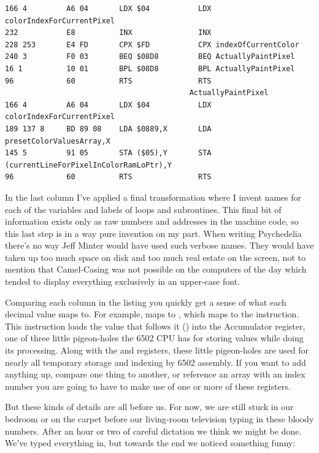 \begin{lstlisting}[basicstyle=\tiny]
166 4         A6 04       LDX $04           LDX colorIndexForCurrentPixel                    
232           E8          INX               INX                                              
228 253       E4 FD       CPX $FD           CPX indexOfCurrentColor                          
240 3         F0 03       BEQ $08D8         BEQ ActuallyPaintPixel                           
16 1          10 01       BPL $08D8         BPL ActuallyPaintPixel                           
96            60          RTS               RTS                                              
                                          ActuallyPaintPixel                               
166 4         A6 04       LDX $04           LDX colorIndexForCurrentPixel                    
189 137 8     BD 89 08    LDA $0889,X       LDA presetColorValuesArray,X                     
145 5         91 05       STA ($05),Y       STA (currentLineForPixelInColorRamLoPtr),Y       
96            60          RTS               RTS                               
\end{lstlisting}

In the last column I've applied a final transformation where I invent names for each of the variables and
labels of loops and subroutines. This final bit of information exists only as raw numbers and addresses
in the machine code, so this last step is in a way pure invention on my part. When writing Psychedelia
there's no way Jeff Minter would have used such verbose names. They would have taken up too much space on
disk and too much real estate on the screen, not to mention that Camel-Casing was not possible on the computers
of the day which tended to display everything exclusively in an upper-case font. 

Comparing each column in the listing you quickly get a sense of what each decimal value maps to. For example,
 maps to , which maps to the  instruction. This instruction loads the value
that follows it () into the Accumulator register, one of three little pigeon-holes the 6502 CPU
has for storing values while doing its processing. Along with the  and  registers, these little
pigeon-holes are used for nearly all temporary storage and indexing by 6502 assembly. If you want to add anything up,
compare one thing to another, or reference an array with an index number you are going to have to make use of one
or more of these registers.

But these kinds of details are all before us. For now, we are still stuck in our bedroom or on the carpet before
our living-room television typing in these bloody numbers. After an hour or two of careful dictation we think
we might be done. We've typed everything in, but towards the end we noticed something funny:

